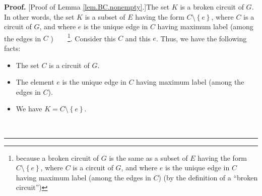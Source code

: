 \documentclass[numbers=enddot,12pt,final,onecolumn,notitlepage]{scrartcl}%
\theoremstyle{definition}
\newenvironment{proof}[1][Proof]{\noindent\textbf{#1.} }{\ \rule{0.5em}{0.5em}}
\newenvironment{verlong}{}{}
\begin{document}
\begin{verlong}
\begin{proof}
[Proof of Lemma \ref{lem.BC.nonempty}.]The set $K$ is a broken circuit of $G$.
In other words, the set $K$ is a subset of $E$ having the form $C\setminus
\left\{  e\right\}  $, where $C$ is a circuit of $G$, and where $e$ is the
unique edge in $C$ having maximum label (among the edges in $C$%
)\ \ \ \ \footnote{because a broken circuit of $G$ is the same as a subset of
$E$ having the form $C\setminus\left\{  e\right\}  $, where $C$ is a circuit
of $G$, and where $e$ is the unique edge in $C$ having maximum label (among
the edges in $C$) (by the definition of a \textquotedblleft broken
circuit\textquotedblright)}. Consider this $C$ and this $e$. Thus, we have the
following facts:

\begin{itemize}
\item The set $C$ is a circuit of $G$.

\item The element $e$ is the unique edge in $C$ having maximum label
(among the edges in $C$).

\item We have $K=C\setminus\left\{  e\right\}  $.
\end{itemize}


\end{proof}
\end{verlong}
\end{document}
